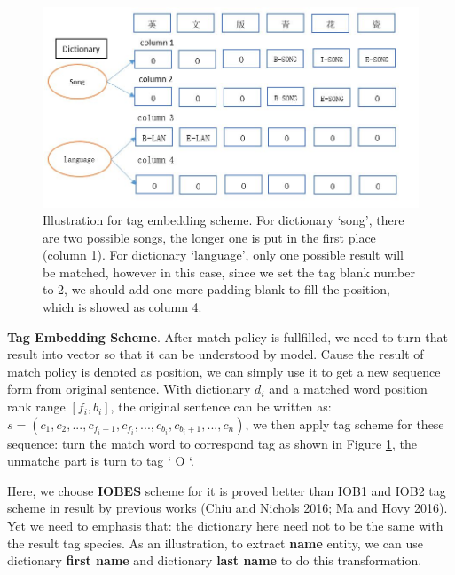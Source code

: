 \documentclass[letterpaper]{article} %
\begin{document}
\begin{figure}[t]
\centering
\includegraphics[width=0.9\columnwidth]{tag_scheme} %
\caption{Illustration for tag embedding scheme. For dictionary `song', there are two possible songs, the longer one is put in the first place (column 1). For dictionary `language', only one possible result will be matched, however in this case, since we set the tag blank number to 2, we should add one more padding blank to fill the position, which is showed as column 4. }
\label{fig2}
\end{figure}

\textbf{Tag Embedding Scheme}. After match policy is fullfilled, we need to turn that result into vector so that it can be understood by model. Cause the result of match policy is denoted as position, we can simply use it to get a new sequence form from original sentence. With dictionary $d_i$ and a matched word position rank range $[f_i, b_i]$, the original sentence can be written as: $ s = (c_1, c_2, ..., c_{f_i - 1}, c_{f_i}, ..., c_{b_i}, c_{b_i + 1}, ..., c_n) $, we then apply tag scheme for these sequence: turn the match word to correspond tag as shown in Figure \ref{fig2}, the unmatche part is turn to tag ` O `.

Here, we choose \textbf{IOBES} scheme for it is proved better than IOB1 and IOB2 tag scheme in result by previous works (Chiu and Nichols 2016; Ma and Hovy 2016). Yet we need to emphasis that: the dictionary here need not to be the same with the result tag species. As an illustration, to extract \textbf{name} entity, we can use dictionary \textbf{first name} and dictionary \textbf{last name} to do this transformation.
\end{document}
